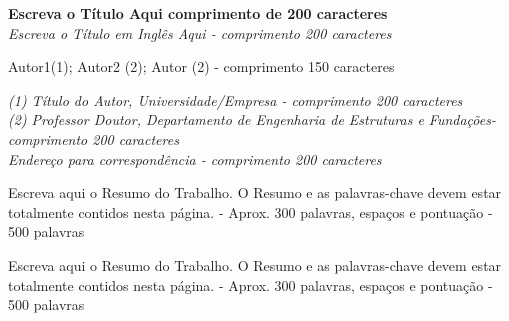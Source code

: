 \documentclass[12pt, a4paper, oneside]{article}
\begin{document}
	\begin{center}
		\large
		\textbf{Escreva o Título Aqui comprimento de 200 caracteres} \\
		\vspace{0.2cm} %
		\normalsize
		\textit{Escreva o Título em Inglês Aqui - comprimento 200 caracteres}
		\vspace{0.5cm} %
	\end{center}
\begin{center}
	Autor1(1); Autor2 (2); Autor (2) - comprimento 150 caracteres 
	
	\vspace{0.5cm}  %
	
    \footnotesize 
	\textit{(1) Título do Autor, Universidade/Empresa - comprimento 200 caracteres} \\
	\textit{(2) Professor Doutor, Departamento de Engenharia de Estruturas e Fundações-comprimento 200 caracteres}\\
    \textit{Endereço para correspondência - comprimento 200 caracteres}
\end{center}
\vspace{0.5cm}  %


 \par
{\small 
\noindent Escreva aqui o Resumo do Trabalho. O Resumo e as palavras-chave devem estar totalmente contidos nesta página. - Aprox. 300 palavras, espaços e pontuação - 500 palavras}\\

\vspace{0.5cm}  %
 \par 
{\small 
\noindent Escreva aqui o Resumo do Trabalho. O Resumo e as palavras-chave devem estar totalmente contidos nesta página. - Aprox. 300 palavras, espaços e pontuação - 500 palavras}\\
\end{document}

